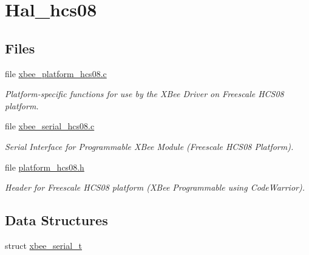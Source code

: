 \hypertarget{group__hal__hcs08}{\section{Hal\-\_\-hcs08}
\label{group__hal__hcs08}
}
\subsection*{Files}
\begin{DoxyCompactItemize}
\item 
file \hyperlink{xbee__platform__hcs08_8c}{xbee\-\_\-platform\-\_\-hcs08.\-c}
\begin{DoxyCompactList}\small\item\em Platform-\/specific functions for use by the X\-Bee Driver on Freescale H\-C\-S08 platform. \end{DoxyCompactList}\item 
file \hyperlink{xbee__serial__hcs08_8c}{xbee\-\_\-serial\-\_\-hcs08.\-c}
\begin{DoxyCompactList}\small\item\em Serial Interface for Programmable X\-Bee Module (Freescale H\-C\-S08 Platform). \end{DoxyCompactList}\item 
file \hyperlink{platform__hcs08_8h}{platform\-\_\-hcs08.\-h}
\begin{DoxyCompactList}\small\item\em Header for Freescale H\-C\-S08 platform (X\-Bee Programmable using Code\-Warrior). \end{DoxyCompactList}\end{DoxyCompactItemize}
\subsection*{Data Structures}
\begin{DoxyCompactItemize}
\item 
struct \hyperlink{structxbee__serial__t}{xbee\-\_\-serial\-\_\-t}
\end{DoxyCompactItemize}
